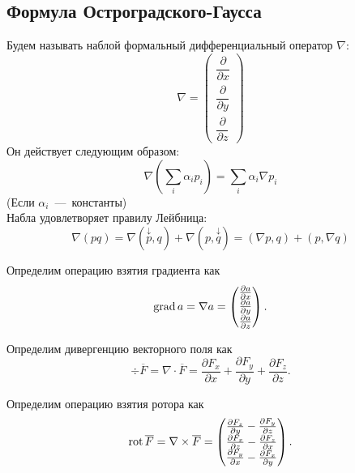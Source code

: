 \subsection{Формула Остроградского-Гаусса}
\begin{definition}
    Будем называть наблой формальный дифференциальный оператор $\nabla$: \[
        \nabla = \begin{pmatrix}
            \dfrac{\partial}{\partial x} \\ \dfrac{\partial}{\partial y} \\ \dfrac{\partial}{\partial z}
        \end{pmatrix}
    \]
    Он действует следующим образом: \[
        \nabla\left(\sum\limits_i \alpha_i p_i\right) = \sum\limits_i \alpha_i \nabla p_i
    \]
    (Если $\alpha_i$~---~константы) \\
    Набла удовлетворяет правилу Лейбница: \[
        \nabla(pq) = \nabla(\overset{\downarrow}{p}, q) + \nabla(p, \overset{\downarrow}{q}) = (\nabla p, q) + (p, \nabla q)
    \]
\end{definition}
\begin{definition}
    Определим операцию взятия градиента как \[\operatorname{grad} a = \nabla a = \begin{pmatrix}
\frac{\partial a}{\partial x} \\
\frac{\partial a}{\partial y} \\
\frac{\partial a}{\partial z}
\end{pmatrix}.
\]
\end{definition}
\begin{definition}
    Определим дивергенцию векторного поля как \[\div \overline{F} = \nabla \cdot \overline{F} = \frac{\partial F_x}{\partial x} + \frac{\partial F_y}{\partial y} + \frac{\partial F_z}{\partial z}.
\]
\end{definition}
\begin{definition}
    Определим операцию взятия ротора как \[\operatorname{rot} \overline{F} = \nabla \times \overline{F} = \begin{pmatrix}
\frac{\partial F_z}{\partial y} - \frac{\partial F_y}{\partial z} \\
\frac{\partial F_x}{\partial z} - \frac{\partial F_z}{\partial x} \\
\frac{\partial F_y}{\partial x} - \frac{\partial F_x}{\partial y}
\end{pmatrix}.
\]
\end{definition}
